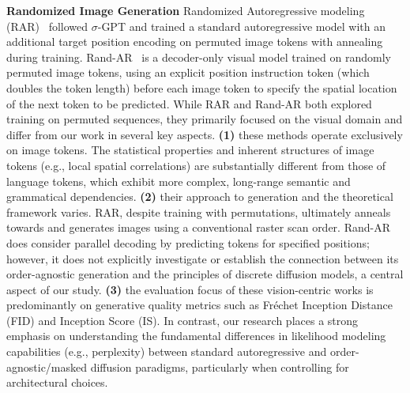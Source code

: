 \textbf{Randomized Image Generation} Randomized Autoregressive modeling (RAR)~\cite{yu2024randomized} followed $\sigma$-GPT \cite{pannatier2024sigma} and trained a standard autoregressive model with an additional target position encoding on permuted image tokens with annealing during training. 
Rand-AR~\cite{pang2024randar} is a decoder-only visual model trained on randomly permuted image tokens, using an explicit position instruction token (which doubles the token length) before each image token to specify the spatial location of the next token to be predicted.
While RAR and Rand-AR both explored training on permuted sequences, they primarily focused on the visual domain and differ from our work in several key aspects.
\textbf{(1)} these methods operate exclusively on image tokens. The statistical properties and inherent structures of image tokens (e.g., local spatial correlations) are substantially different from those of language tokens, which exhibit more complex, long-range semantic and grammatical dependencies.
\textbf{(2)} their approach to generation and the theoretical framework varies. RAR, despite training with permutations, ultimately anneals towards and generates images using a conventional raster scan order. Rand-AR does consider parallel decoding by predicting tokens for specified positions; however, it does not explicitly investigate or establish the connection between its order-agnostic generation and the principles of discrete diffusion models, a central aspect of our study.
\textbf{(3)} the evaluation focus of these vision-centric works is predominantly on generative quality metrics such as Fréchet Inception Distance (FID) and Inception Score (IS). In contrast, our research places a strong emphasis on understanding the fundamental differences in likelihood modeling capabilities (e.g., perplexity) between standard autoregressive and order-agnostic/masked diffusion paradigms, particularly when controlling for architectural choices.